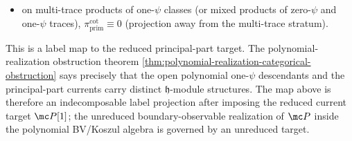 \begin{constr}
\begin{itemize}
      \(\psi\)'s, \(\pi_{\mathrm{prim}}^{\mathrm{cot}}\equiv0\);
    \item on multi-trace products of one-$\psi$ classes (or mixed
      products of zero-$\psi$ and one-$\psi$ traces),
      $\pi_{\mathrm{prim}}^{\mathrm{cot}}\equiv 0$ (projection away from
      the multi-trace stratum).
  \end{itemize}
	  This is a label map to the reduced principal-part target. The
	  polynomial-realization obstruction theorem
	  \ref{thm:polynomial-realization-categorical-obstruction}
	  says precisely that the open polynomial one-$\psi$ descendants and
	  the principal-part currents carry distinct
	  $\mathfrak h$-module structures. The map above is therefore an
	  indecomposable label projection after imposing the reduced current target
	  $\mc P[1]$; the unreduced boundary-observable realization of
	  $\mc P$ inside the polynomial BV/Koszul algebra is governed by an
	  unreduced target.
\end{constr}

